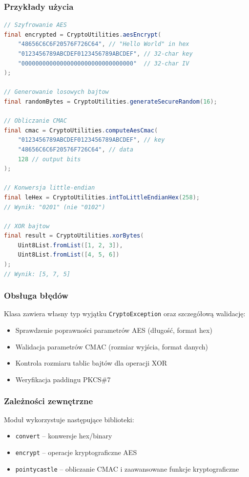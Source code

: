 \documentclass[a4paper,12pt]{article}
\begin{document}
\subsubsection{Przykłady użycia}
\begin{lstlisting}[language=Java]
// Szyfrowanie AES
final encrypted = CryptoUtilities.aesEncrypt(
    "48656C6C6F20576F726C64", // "Hello World" in hex
    "0123456789ABCDEF0123456789ABCDEF", // 32-char key
    "00000000000000000000000000000000"  // 32-char IV
);

// Generowanie losowych bajtow
final randomBytes = CryptoUtilities.generateSecureRandom(16);

// Obliczanie CMAC
final cmac = CryptoUtilities.computeAesCmac(
    "0123456789ABCDEF0123456789ABCDEF", // key
    "48656C6C6F20576F726C64", // data
    128 // output bits
);

// Konwersja little-endian
final leHex = CryptoUtilities.intToLittleEndianHex(258);
// Wynik: "0201" (nie "0102")

// XOR bajtow
final result = CryptoUtilities.xorBytes(
    Uint8List.fromList([1, 2, 3]),
    Uint8List.fromList([4, 5, 6])
);
// Wynik: [5, 7, 5]
\end{lstlisting}

\subsubsection{Obsługa błędów}
Klasa zawiera własny typ wyjątku \texttt{CryptoException} oraz szczegółową walidację:
\begin{itemize}
    \item Sprawdzenie poprawności parametrów AES (długość, format hex)
    \item Walidacja parametrów CMAC (rozmiar wyjścia, format danych)
    \item Kontrola rozmiaru tablic bajtów dla operacji XOR
    \item Weryfikacja paddingu PKCS\#7
\end{itemize}

\subsubsection{Zależności zewnętrzne}
Moduł wykorzystuje następujące biblioteki:
\begin{itemize}
    \item \texttt{convert} -- konwersje hex/binary
    \item \texttt{encrypt} -- operacje kryptograficzne AES
    \item \texttt{pointycastle} -- obliczanie CMAC i zaawansowane funkcje kryptograficzne
\end{itemize}
\end{document}
